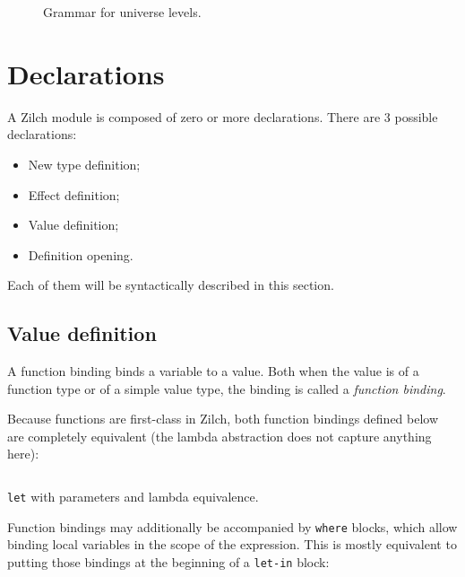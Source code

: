 \begin{figure}[H]
	\centering


	\caption{Grammar for universe levels.}
	\label{fig:zilch-grammar-types-level-grammar}
\end{figure}

\section{Declarations}\label{sec:zilch-grammar-declarations}

A Zilch module is composed of zero or more declarations.
There are 3 possible declarations:
\begin{itemize}
	\item New type definition;
	\item Effect definition;
	\item Value definition;
	\item Definition opening.
\end{itemize}

\noindent Each of them will be syntactically described in this section.

\subsection{Value definition}\label{subsec:zilch-grammar-declarations-value}

A function binding binds a variable to a value.
Both when the value is of a function type or of a simple value type, the binding is called a \textit{function binding}.
\vspace*{\baselineskip}

Because functions are first-class in Zilch, both function bindings defined below are completely equivalent (the lambda abstraction does not capture anything here):

\begin{listing}[H]
	\inputminted{\zilchlexer}{examples/function-value-equivalence.zc}

	\captionsetup{style=invisible}
	\caption{\texttt{let} with parameters and lambda equivalence.}
\end{listing}
\vspace*{-\baselineskip}

Function bindings may additionally be accompanied by \verb|where| blocks, which allow binding local variables in the scope of the expression.
This is mostly equivalent to putting those bindings at the beginning of a \verb|let-in| block:

